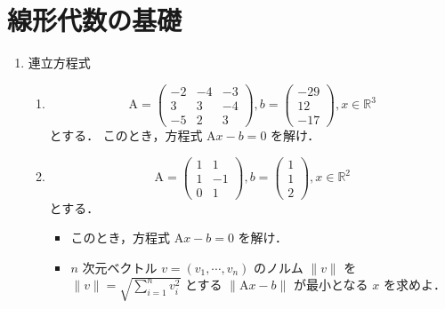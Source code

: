 \section{線形代数の基礎}

\begin{enumerate}[label=問\arabic*.]
  \vspace{2mm}
  \item 連立方程式

  \vspace{1mm}
  \begin{enumerate}[label=(\roman*)]
    \item
    \begin{equation}
      \mathrm{A} = \left(
        \begin{array}{rrr}
          -2 & -4 & -3 \\ 3 & 3 & -4 \\ -5 & 2 & 3
        \end{array} \right),
      b = \left(
        \begin{array}{r}
          -29 \\ 12 \\ -17
        \end{array}
        \right),
      x \in \mathbb{R}^3
    \end{equation}
    とする．
    このとき，方程式 $\mathrm{A}x-b=0$ を解け．
    
    \item
    \begin{equation}
      \mathrm{A} = \left(
        \begin{array}{rrr}
           1 & 1 \\ 1 & -1 \\ 0 & 1
        \end{array}
        \right),
      b=\left( \begin{array}{r} 1 \\ 1 \\ 2 \end{array} \right),
      x \in \mathbb{R}^2
    \end{equation}
    とする．
    \begin{itemize}
      \item このとき，方程式 $\mathrm{A}x-b=0$ を解け．
      \item $n$ 次元ベクトル $v = (v_1, \cdots, v_n)$ のノルム $\|v\|$ を $\|v\| = \sqrt{\sum_{i=1}^n v_i^2}$ とする
      $\|\mathrm{A}x-b\|$ が最小となる $x$ を求めよ．
    \end{itemize}
    

\end{enumerate}
\end{enumerate}
